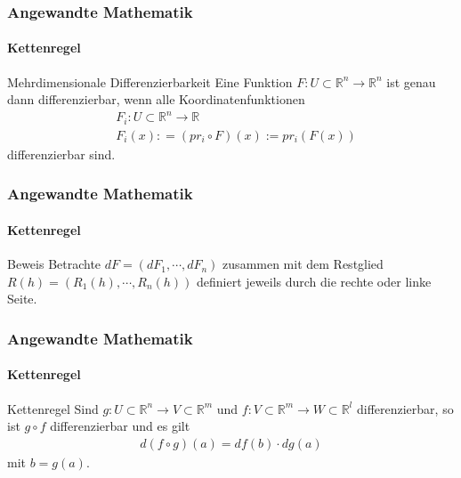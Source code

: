 \documentclass{beamer}
\begin{document}
\begin{frame}
    \frametitle{Angewandte Mathematik}
\framesubtitle{Kettenregel}

    \begin{block}{Mehrdimensionale Differenzierbarkeit}
Eine Funktion $F: U \subset \mathbb{R}^n \to \mathbb{R}^n$ ist genau dann differenzierbar, wenn alle Koordinatenfunktionen
\begin{align*}
& F_i :U \subset \mathbb{R}^n \to \mathbb{R} \\
& F_i(x): = (pr_i \circ F) (x) := pr_i(F(x))
\end{align*}
differenzierbar sind.
\end{block}

 \end{frame}



\begin{frame}
    \frametitle{Angewandte Mathematik}
\framesubtitle{Kettenregel}

    \begin{block}{Beweis}
Betrachte $dF = (dF_1, \cdots, dF_n) $ zusammen mit dem  Restglied $R(h)  = (R_1(h), \cdots, R_n(h))$ definiert jeweils durch die rechte oder linke Seite.
\end{block}

 \end{frame}




\begin{frame}
    \frametitle{Angewandte Mathematik}
\framesubtitle{Kettenregel}
\begin{block}{Kettenregel}
Sind $g: U \subset \mathbb{R}^n \to V  \subset \mathbb{R}^m$ und $f: V \subset \mathbb{R}^m \to W  \subset \mathbb{R}^l$ differenzierbar, so ist $g \circ f$ differenzierbar und es gilt
\begin{align*}
d(f \circ g)(a) = df(b) \cdot dg(a)
\end{align*}
mit $b = g(a)$.
\end{block}

 \end{frame}
\end{document}
